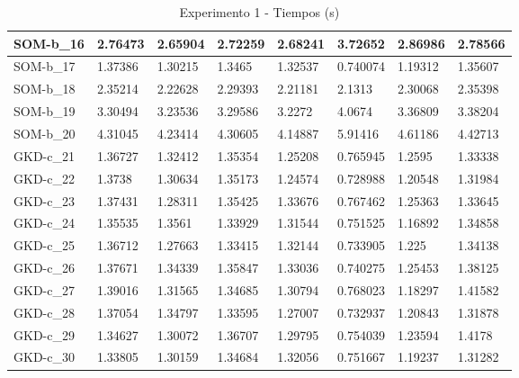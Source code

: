 \documentclass[11pt,a4paper]{article}
\begin{document}
\begin{table}[H]
\begin{tabular}{l|l|l|l|l|l|l|l|}
			\multicolumn{1}{|l|}{SOM-b\_16} & 2.76473  & 2.65904  & 2.72259  & 2.68241  & 3.72652  & 2.86986  & 2.78566  \\ \hline
			\multicolumn{1}{|l|}{SOM-b\_17} & 1.37386  & 1.30215  & 1.3465   & 1.32537  & 0.740074 & 1.19312  & 1.35607  \\ \hline
			\multicolumn{1}{|l|}{SOM-b\_18} & 2.35214  & 2.22628  & 2.29393  & 2.21181  & 2.1313   & 2.30068  & 2.35398  \\ \hline
			\multicolumn{1}{|l|}{SOM-b\_19} & 3.30494  & 3.23536  & 3.29586  & 3.2272   & 4.0674   & 3.36809  & 3.38204  \\ \hline
			\multicolumn{1}{|l|}{SOM-b\_20} & 4.31045  & 4.23414  & 4.30605  & 4.14887  & 5.91416  & 4.61186  & 4.42713  \\ \hline
			\multicolumn{1}{|l|}{GKD-c\_21} & 1.36727  & 1.32412  & 1.35354  & 1.25208  & 0.765945 & 1.2595   & 1.33338  \\ \hline
			\multicolumn{1}{|l|}{GKD-c\_22} & 1.3738   & 1.30634  & 1.35173  & 1.24574  & 0.728988 & 1.20548  & 1.31984  \\ \hline
			\multicolumn{1}{|l|}{GKD-c\_23} & 1.37431  & 1.28311  & 1.35425  & 1.33676  & 0.767462 & 1.25363  & 1.33645  \\ \hline
			\multicolumn{1}{|l|}{GKD-c\_24} & 1.35535  & 1.3561   & 1.33929  & 1.31544  & 0.751525 & 1.16892  & 1.34858  \\ \hline
			\multicolumn{1}{|l|}{GKD-c\_25} & 1.36712  & 1.27663  & 1.33415  & 1.32144  & 0.733905 & 1.225    & 1.34138  \\ \hline
			\multicolumn{1}{|l|}{GKD-c\_26} & 1.37671  & 1.34339  & 1.35847  & 1.33036  & 0.740275 & 1.25453  & 1.38125  \\ \hline
			\multicolumn{1}{|l|}{GKD-c\_27} & 1.39016  & 1.31565  & 1.34685  & 1.30794  & 0.768023 & 1.18297  & 1.41582  \\ \hline
			\multicolumn{1}{|l|}{GKD-c\_28} & 1.37054  & 1.34797  & 1.33595  & 1.27007  & 0.732937 & 1.20843  & 1.31878  \\ \hline
			\multicolumn{1}{|l|}{GKD-c\_29} & 1.34627  & 1.30072  & 1.36707  & 1.29795  & 0.754039 & 1.23594  & 1.4178   \\ \hline
			\multicolumn{1}{|l|}{GKD-c\_30} & 1.33805  & 1.30159  & 1.34684  & 1.32056  & 0.751667 & 1.19237  & 1.31282  \\ \hline
		\end{tabular}
		\caption{ Experimento 1 - Tiempos (s) }
		\label{212}
	\end{table}
\end{document}
